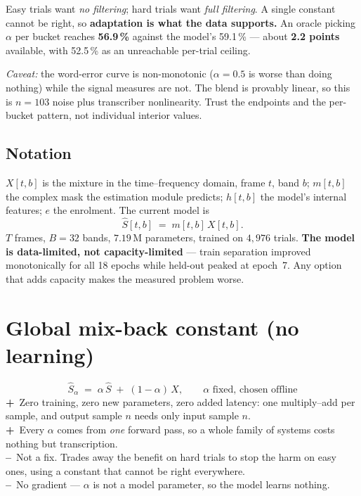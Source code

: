 \documentclass[11pt,a4paper]{article}
\newcommand{\pro}{\textbf{\textsf{+}}~}
\newcommand{\con}{\textbf{\textsf{--}}~}
\begin{document}
Easy trials want \emph{no filtering}; hard trials want \emph{full filtering}. A
single constant cannot be right, so \textbf{adaptation is what the data
supports.} An oracle picking $\alpha$ per bucket reaches \textbf{56.9\,\%}
against the model's 59.1\,\% --- about \textbf{2.2 points} available, with
52.5\,\% as an unreachable per-trial ceiling.

\emph{Caveat:} the word-error curve is non-monotonic ($\alpha{=}0.5$ is worse
than doing nothing) while the signal measures are not. The blend is provably
linear, so this is $n{=}103$ noise plus transcriber nonlinearity. Trust the
endpoints and the per-bucket pattern, not individual interior values.

\subsection*{Notation}

$X[t,b]$ is the mixture in the time--frequency domain, frame $t$, band $b$;
$m[t,b]$ the complex mask the estimation module predicts; $h[t,b]$ the model's
internal features; $e$ the enrolment. The current model is
\[
\hat{S}[t,b] \;=\; m[t,b]\,X[t,b].
\]
$T$ frames, $B=32$ bands, $7.19$\,M parameters, trained on $4{,}976$ trials.
\textbf{The model is data-limited, not capacity-limited} --- train separation
improved monotonically for all 18 epochs while held-out peaked at epoch~7. Any
option that adds capacity makes the measured problem worse.

\section{Global mix-back constant (no learning)}
\[
\hat{S}_\alpha \;=\; \alpha\,\hat{S} \;+\; (1-\alpha)\,X,
\qquad \alpha \text{ fixed, chosen offline}
\]
\pro Zero training, zero new parameters, zero added latency: one multiply--add
per sample, and output sample $n$ needs only input sample $n$.\\
\pro Every $\alpha$ comes from \emph{one} forward pass, so a whole family of
systems costs nothing but transcription.\\
\con Not a fix. Trades away the benefit on hard trials to stop the harm on easy
ones, using a constant that cannot be right everywhere.\\
\con No gradient --- $\alpha$ is not a model parameter, so the model learns
nothing.
\end{document}
